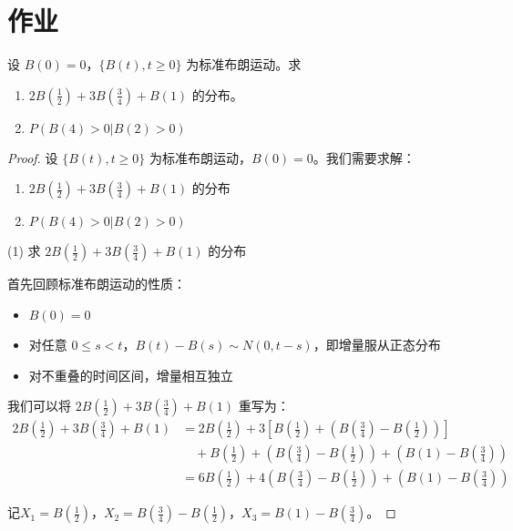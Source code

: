 \documentclass[lang=cn,10pt,thmcnt=section]{elegantbook}
\begin{document}
\section{作业}
\begin{example}
	设 $B(0) = 0$，$\{B(t), t \geq 0\}$ 为标准布朗运动。求
    \begin{enumerate}
        \item $2B(\frac{1}{2}) + 3B(\frac{3}{4}) + B(1)$ 的分布。
        \item $P(B(4) > 0 | B(2) > 0)$
    \end{enumerate}
\end{example}
\begin{proof}
	设 $\{B(t), t \geq 0\}$ 为标准布朗运动，$B(0) = 0$。我们需要求解：

\begin{enumerate}
    \item $2B(\frac{1}{2}) + 3B(\frac{3}{4}) + B(1)$ 的分布
    \item $P(B(4) > 0 | B(2) > 0)$
\end{enumerate}

(1) 求 $2B(\frac{1}{2}) + 3B(\frac{3}{4}) + B(1)$ 的分布

首先回顾标准布朗运动的性质：
\begin{itemize}
    \item $B(0) = 0$
    \item 对任意 $0 \leq s < t$，$B(t) - B(s) \sim N(0, t-s)$，即增量服从正态分布
    \item 对不重叠的时间区间，增量相互独立
\end{itemize}

我们可以将 $2B(\frac{1}{2}) + 3B(\frac{3}{4}) + B(1)$ 重写为：
\begin{align}
2B\left(\frac{1}{2}\right) + 3B\left(\frac{3}{4}\right) + B(1) &= 2B\left(\frac{1}{2}\right) + 3\left[B\left(\frac{1}{2}\right) + \left(B\left(\frac{3}{4}\right) - B\left(\frac{1}{2}\right)\right)\right] \\
&\quad + B\left(\frac{1}{2}\right) + \left(B\left(\frac{3}{4}\right) - B\left(\frac{1}{2}\right)\right) + \left(B(1) - B\left(\frac{3}{4}\right)\right) \\
&= 6B\left(\frac{1}{2}\right) + 4\left(B\left(\frac{3}{4}\right) - B\left(\frac{1}{2}\right)\right) + \left(B(1) - B\left(\frac{3}{4}\right)\right)
\end{align}

记$X_1 = B\left(\frac{1}{2}\right)$，$X_2 = B\left(\frac{3}{4}\right) - B\left(\frac{1}{2}\right)$，$X_3 = B(1) - B\left(\frac{3}{4}\right)$。


\end{proof}
\end{document}
